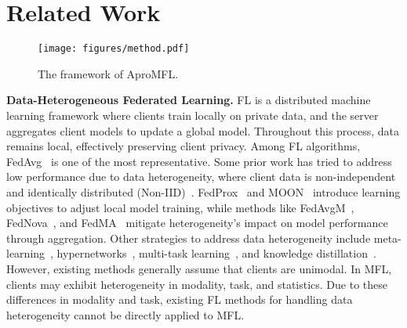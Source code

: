 \section{Related Work}
\label{sec:formatting}
\begin{figure*}[t]
\centering
\texttt{[image: figures/method.pdf]} %
\caption{The framework of AproMFL.}
\label{fig:method}
\end{figure*}
\noindent\textbf{Data-Heterogeneous Federated Learning.}
FL is a distributed machine learning framework where clients train locally on private data, and the server aggregates client models to update a global model. 
Throughout this process, data remains local, effectively preserving client privacy. 
Among FL algorithms, FedAvg~\cite{mcmahan2017communication} is one of the most representative. 
Some prior work has tried to address low performance due to data heterogeneity, where client data is non-independent and identically distributed (Non-IID)~\cite{li2023exploring}.
FedProx~\cite{li2020federated} and MOON~\cite{li2021model} introduce learning objectives to adjust local model training, while methods like FedAvgM~\cite{hsu2019measuring}, FedNova~\cite{wang2020tackling}, and FedMA~\cite{wang2020federated} mitigate heterogeneity's impact on model performance through aggregation.
Other strategies to address data heterogeneity include meta-learning~\cite{fallah2020personalized}, hypernetworks~\cite{shamsian2021personalized}, multi-task learning~\cite{lu2024fedhca2}, and knowledge distillation~\cite{zhang2022fine}. 
However, existing methods generally assume that clients are unimodal.
In MFL, clients may exhibit heterogeneity in modality, task, and statistics. Due to these differences in modality and task, existing FL methods for handling data heterogeneity cannot be directly applied to MFL.


